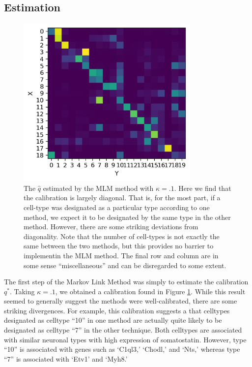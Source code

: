\subsection{Estimation}

\begin{figure}
\includegraphics[width=0.8\textwidth]{../images/qhat}
\caption{The $\hat q$ estimated by the MLM method with $\kappa=.1$.  Here we find that the calibration is largely diagonal.  That is, for the most part, if a cell-type was designated as a particular type according to one method, we expect it to be designated by the same type in the other method.  However, there are some striking deviations from diagonality.  Note that the number of cell-types is not exactly the same between the two methods, but this provides no barrier to implementin the MLM method.   The final row and column are in some sense ``miscellaneous'' and can be disregarded to some extent.\label{fig:allenout}}
\end{figure}

The first step of the Markov Link Method was simply to estimate the calibration $q^*$.  Taking $\kappa=.1$, we obtained a calibration found in Figure \ref{fig:allenout}.  While this result seemed to generally suggest the methods were well-calibrated, there are some striking divergences.  For example, this calibration suggests a that celltypes designated as celltype ``10'' in one method are actually quite likely to be designated as celltype ``7'' in the other technique.  Both celltypes are associated with similar neuronal types with high expression of somatostatin.  However, type ``10'' is associated with genes such as `C1ql3,' `Chodl,'  and `Nts,' whereas type ``7'' is associated with `Etv1' and `Myh8.'  

